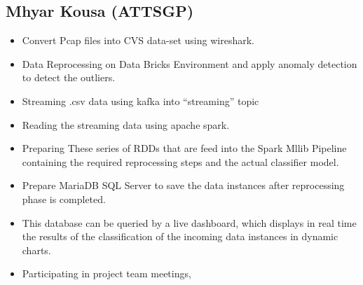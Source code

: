 \documentclass{article}
\begin{document}
\subsection{Mhyar Kousa (ATTSGP)}
\begin{itemize}
\item Convert Pcap files into CVS data-set using wireshark.
    \item Data  Reprocessing on Data Bricks Environment and apply anomaly detection to detect the outliers.
    \item Streaming .csv data using kafka into “streaming” topic
    \item Reading the streaming data using apache spark.
    \item Preparing These series of RDDs that are feed into the Spark Mllib Pipeline containing the required reprocessing steps and the actual classifier model.
    \item Prepare MariaDB SQL Server to save  the data instances after reprocessing phase is completed.
    \item This database can be queried by a live dashboard, which displays in real time the results of the classification of the incoming data instances in dynamic charts.
     \item Participating in project team meetings, 
\end{itemize}
\end{document}

